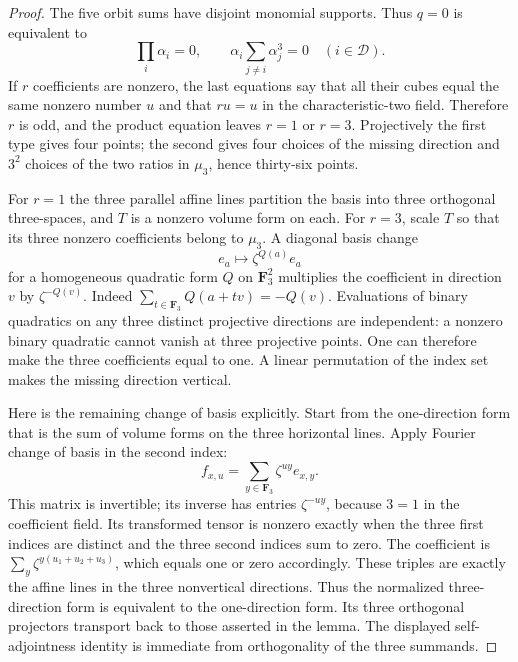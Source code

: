\begin{proof}
The five orbit sums have disjoint monomial supports.  Thus $q=0$ is
equivalent to
\[
 \prod_i\alpha_i=0,\qquad
 \alpha_i\sum_{j\ne i}\alpha_j^3=0\quad(i\in\mathcal D).
\]
If $r$ coefficients are nonzero, the last equations say that all their
cubes equal the same nonzero number $u$ and that $ru=u$ in the
characteristic-two field.  Therefore $r$ is odd, and the product equation
leaves $r=1$ or $r=3$.  Projectively the first type gives four points;
the second gives four choices of the missing direction and $3^2$ choices
of the two ratios in $\mu_3$, hence thirty-six points.

For $r=1$ the three parallel affine lines partition the basis into
three orthogonal three-spaces, and $T$ is a nonzero volume form on each.
For $r=3$, scale $T$ so that its three nonzero coefficients belong to
$\mu_3$.  A diagonal basis change
\[
                  e_a\longmapsto\zeta^{Q(a)}e_a
\]
for a homogeneous quadratic form $Q$ on $\mathbf F_3^2$ multiplies the
coefficient in direction $v$ by $\zeta^{-Q(v)}$.  Indeed
$\sum_{t\in\mathbf F_3}Q(a+tv)=-Q(v)$.
Evaluations of binary quadratics on any three distinct projective
directions are independent: a nonzero binary quadratic cannot vanish at
three projective points.  One can therefore make the three coefficients
equal to one.  A linear permutation of the index set makes the missing
direction vertical.

Here is the remaining change of basis explicitly.  Start from the
one-direction form that is the sum of volume forms on the three
horizontal lines.  Apply Fourier change of basis in the second index:
\[
              f_{x,u}=\sum_{y\in\mathbf F_3}\zeta^{uy}e_{x,y}.
\]
This matrix is invertible; its inverse has entries $\zeta^{-uy}$,
because $3=1$ in the coefficient field.  Its transformed tensor is
nonzero exactly when the three first indices are distinct and the
three second indices sum to zero.  The coefficient is
$\sum_y\zeta^{y(u_1+u_2+u_3)}$, which equals one or zero accordingly.
These triples are exactly the affine lines in the three nonvertical
directions.  Thus the normalized three-direction form is equivalent
to the one-direction form.  Its three orthogonal projectors transport
back to those asserted in the lemma.  The displayed self-adjointness
identity is immediate from orthogonality of the three summands.
\end{proof}

